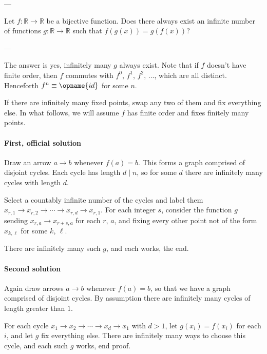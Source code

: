 
---

Let $f:\mathbb R\to\mathbb R$ be a bijective function. Does there always exist an infinite number of functions $g:\mathbb R\to\mathbb R$ such that $f(g(x))=g(f(x))$?

---

The answer is yes, infinitely many $g$ always exist. Note that if $f$ doesn't have finite order, then $f$ commutes with $f^0$, $f^1$, $f^2$, $\ldots$, which are all distinct. Henceforth $f^n\equiv\opname{id}$ for some $n$.

If there are infinitely many fixed points, swap any two of them and fix everything else. In what follows, we will assume $f$ has finite order and fixes finitely many points.

\paragraph{First, official solution} Draw an arrow $a\to b$ whenever $f(a)=b$. This forms a graph comprised of disjoint cycles. Each cycle has length $d\mid n$, so for some $d$ there are infinitely many cycles with length $d$.

Select a countably infinite number of the cycles and label them $x_{r,1}\to x_{r,2}\to\cdots\to x_{r,d}\to x_{r,1}$. For each integer $s$, consider the function $g$ sending $x_{r,a}\to x_{r+s,a}$ for each $r$, $a$, and fixing every other point not of the form $x_{k,\ell}$ for some $k$, $\ell$.

There are infinitely many such $g$, and each works, the end.

\paragraph{Second solution} Again draw arrows $a\to b$ whenever $f(a)=b$, so that we have a graph comprised of disjoint cycles. By assumption there are infinitely many cycles of length greater than $1$.

For each cycle $x_1\to x_2\to\cdots\to x_d\to x_1$ with $d>1$, let $g(x_i)=f(x_i)$ for each $i$, and let $g$ fix everything else. There are infinitely many ways to choose this cycle, and each such $g$ works, end proof.

